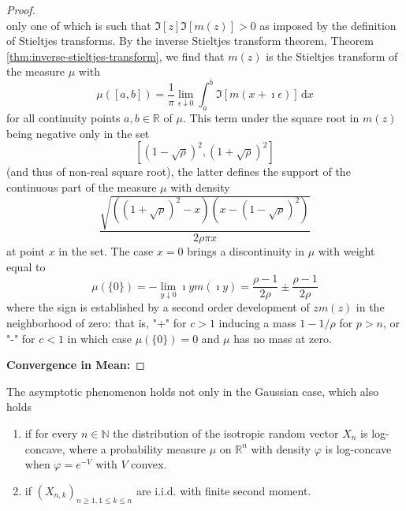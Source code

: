 \begin{proof}
\begin{equation*}
    \end{equation*}
    only one of which is such that $\Im[z]\Im[m(z)]>0$ as imposed by the definition of Stieltjes transforms. By the inverse Stieltjes transform theorem, Theorem \ref{thm:inverse-stieltjes-transform}, we find that $m(z)$ is the Stieltjes transform of the measure $\mu$ with
    \begin{equation*}
        \mu([a,b])=\frac{1}{\pi}\lim_{\epsilon\downarrow 0}\int_{a}^{b}\Im[m(x+\imath\epsilon)]\,\mathrm{d}x
    \end{equation*}
    for all continuity points $a,b\in\mathbb{R}$ of $\mu$. This term under the square root in $m(z)$ being negative only in the set
    \begin{equation*}
        \left[(1-\sqrt{\rho})^{2},(1+\sqrt{\rho})^{2}\right]
    \end{equation*}
    (and thus of non-real square root), the latter defines the support of the continuous part of the measure $\mu$ with density
    \begin{equation*}
        \frac{\sqrt{\left((1+\sqrt{\rho})^{2}-x\right)\left(x-(1-\sqrt{\rho})^{2}\right)}}{2\rho\pi x}
    \end{equation*}
    at point $x$ in the set. The case $x=0$ brings a discontinuity in $\mu$ with weight equal to
    \begin{equation*}
        \mu(\{0\})=-\lim_{y\downarrow 0}\imath ym(\imath y)=\frac{\rho-1}{2\rho}\pm\frac{\rho-1}{2\rho}
    \end{equation*}
    where the sign is established by a second order development of $z m(z)$ in the neighborhood of zero: that is, "+" for $c>1$ inducing a mass $1-1/\rho$ for $p>n$, or "-" for $c<1$ in which case $\mu(\{0\})=0$ and $\mu$ has no mass at zero.

    \textbf{Convergence in Mean:}
\end{proof}

\begin{remark}
    The asymptotic phenomenon holds not only in the Gaussian case, which also holds
    \begin{enumerate}
        \item if for every $n\in\mathbb{N}$ the distribution of the isotropic random vector $X_{n}$ is log-concave, where a probability measure $\mu$ on $\mathbb{R}^{n}$ with density $\varphi$ is log-concave when $\varphi=e^{-V}$ with $V$ convex.
        \item if $\left(X_{n,k}\right)_{n\geq 1,1\leq k\leq n}$ are i.i.d. with finite second moment.
    \end{enumerate}
\end{remark}

